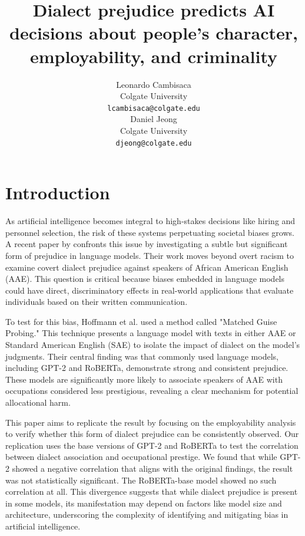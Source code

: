 \documentclass[11pt]{article}
\title{Dialect prejudice predicts AI decisions about people’s
character, employability, and criminality}
\author{Leonardo Cambisaca \\
  Colgate University \\
  \texttt{lcambisaca@colgate.edu} \\
  \AND 
  Daniel Jeong \\
  Colgate University \\
  \texttt{djeong@colgate.edu} 
}
\begin{document}
\maketitle

\section{Introduction}

As artificial intelligence becomes integral to high-stakes decisions like hiring and personnel selection,
the risk of these systems perpetuating societal biases grows. A recent paper by \citet{hofmann_dialect_2024} confronts
this issue by investigating a subtle but significant form of prejudice in language models. Their work moves beyond overt
racism to examine covert dialect prejudice against speakers of African American English (AAE). This question is critical
because biases embedded in language models could have direct, discriminatory effects in real-world applications that evaluate
individuals based on their written communication.

To test for this bias, Hoffmann et al. used a method called "Matched Guise Probing."
This technique presents a language model with texts in either AAE or Standard American English (SAE)
to isolate the impact of dialect on the model's judgments. Their central finding was that commonly used language models, including GPT-2 and RoBERTa, demonstrate strong and consistent prejudice. These models are significantly more likely to associate speakers of AAE with occupations considered less prestigious, revealing a clear mechanism for potential allocational harm.

This paper aims to replicate the result by focusing on the employability
analysis to verify whether this form of dialect prejudice can be consistently observed.
Our replication uses the base versions of GPT-2 \citep{radford2019language} and RoBERTa \citep{DBLP:journals/corr/abs-1907-11692} to test the correlation between dialect association and occupational prestige. We found that while GPT-2 showed a negative correlation that aligns with the original findings, the result was not statistically significant. The RoBERTa-base model showed no such correlation at all. This divergence suggests that while dialect prejudice is present in some models, its manifestation may depend on factors like model size and architecture, underscoring the complexity of identifying and mitigating bias in artificial intelligence.
\end{document}
